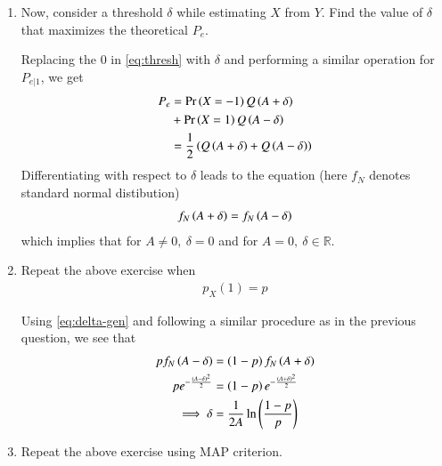\documentclass[journal,12pt,twocolumn]{IEEEtran}
\renewcommand\thesection{\arabic{section}}
\begin{document}
\begin{enumerate}[label=\thesection.\arabic*
,ref=\thesection.\theenumi]
\item Now, consider a threshold $\delta$ while estimating $X$ from $Y$. Find the value of $\delta$ that maximizes the theoretical $P_e$.

\solution
Replacing the $0$ in \eqref{eq:thresh} with $\delta$ and performing a similar operation for $P_{e|1}$, we get
\begin{align}
	P_e &= \Pr\left(X = -1\right)Q\left(A + \delta\right) \nonumber \\ 
	&+ \Pr\left(X = 1\right)Q\left(A - \delta\right) \label{eq:delta-gen} \\
	&= \frac{1}{2}\left(Q\left(A + \delta\right) + Q\left(A - \delta\right)\right) 
	\label{eq:func-delta}
\end{align}
Differentiating with respect to $\delta$ leads to the equation (here $f_N$ denotes standard normal distibution)
\begin{align}
	f_N\left(A + \delta\right) = f_N\left(A - \delta\right)
\end{align}
which implies that for $A \neq 0,\ \delta = 0$ and for $A = 0,\ \delta \in \mathbb{R}$.

\item Repeat the above exercise when 
	\begin{align}
		p_X(1) = p
	\end{align}
	
\solution Using \eqref{eq:delta-gen} and following a similar procedure as in the previous question, we see that
\begin{align}
	pf_N\left(A - \delta\right) &= \left(1 - p\right)f_N\left(A + \delta\right) \\
	pe^{-\frac{\left(A - \delta\right)^2}{2}} &= \left(1 - p\right)e^{-\frac{\left(A + \delta\right)^2}{2}} \\
	\implies \delta &= \frac{1}{2A}\ln{\ensuremath{\left(\frac{1 - p}{p}\right)}}
	\label{eq:delta-sol}
\end{align}

\item Repeat the above exercise using MAP criterion.


\end{enumerate}
\end{document}
